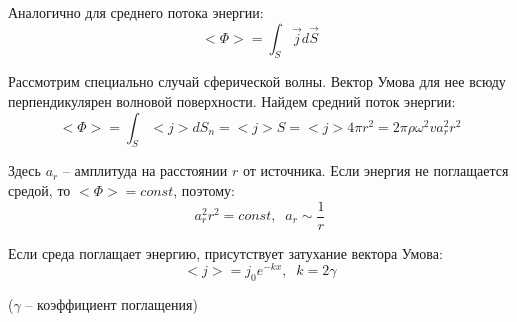 \documentclass{article}
\begin{document}
	Аналогично для среднего потока энергии:
	\begin{equation}
		<\Phi> = \int_S \vec jd\vec S
	\end{equation}

	Рассмотрим специально случай сферической волны. Вектор Умова для нее всюду перпендикулярен волновой поверхности. Найдем средний поток энергии:
	\begin{equation}
		<\Phi>=\int_S <j>dS_n = <j>S = <j>4\pi r^2= 2\pi\rho\omega^2 v a_r^2 r^2
	\end{equation}

	Здесь $a_r$ -- амплитуда на расстоянии $r$ от источника. Если энергия не поглащается средой, то $<\Phi>=const$, поэтому:
	\begin{equation}
		a_r^2r^2 = const,\;\;a_r\sim\frac{1}{r}
	\end{equation}

	Если среда поглащает энергию, присутствует затухание вектора Умова:
	\begin{equation}
		<j> = j_0e^{-kx},\;\;k=2\gamma
	\end{equation}

	($\gamma$ -- коэффициент поглащения)
\end{document}
